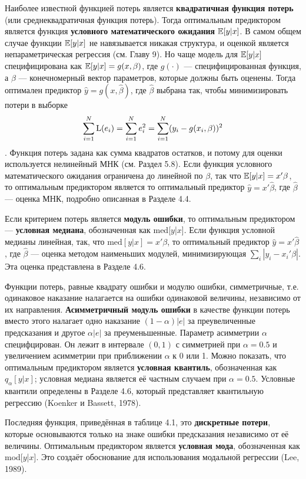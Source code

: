 Наиболее известной функцией потерь является \textbf{квадратичная функция потерь}  (или среднеквадратичная функция потерь). Тогда оптимальным предиктором является функция \textbf{условного математического ожидания} $\mathbb{E}{[y|x]}$. В самом общем случае функции $\mathbb{E}{[y|x]}$ не навязывается никакая структура, и оценкой является непараметрическая регрессия (см. Главу 9). Но чаще модель для $\mathbb{E}{[y|x]}$ специфицирована как $\mathbb{E}{[y|x]} = g(x, \beta)$, где $g(\cdot)$ --- специфицированная функция, а $\beta$ --- конечномерный вектор параметров, которые должны быть оценены. Тогда оптимален предиктор $\hat{y} = g(x, \hat{\beta})$, где $\hat{\beta}$ выбрана так, чтобы минимизировать потери в выборке 
\[
\sum_{i=1}^{N}\mathrm{L}(e_i) = \sum_{i=1}^{N}e_i^2 = \sum_{i=1}^{N}(y_i - g(x_i, \beta))^2
\].
Функция потерь задана как сумма квадратов остатков, и потому для оценки используется нелинейный МНК (см. Раздел 5.8). Если функция условного математического ожидания ограничена до линейной по $\beta$, так что $\mathbb{E}{[y|x]} = x' \beta $, то оптимальным предиктором является то оптимальный предиктор $\hat{y}=x'\hat{\beta}$, где $\hat{\beta}$ --- оценка МНК, подробно описанная в Разделе 4.4. 

Если критерием потерь является \textbf{модуль ошибки}, то оптимальным предиктором --- \textbf{условная медиана}, обозначенная как med[$y$|$x$]. Если функция условной медианы линейная, так, что $\mathrm{med}[y|x] = x'\beta$, то оптимальный предиктор $\hat{y}=x'\hat{\beta}$, где  $\hat{\beta}$ --- оценка методом наименьших модулей, минимизирующая $\sum_i |y_i - x_i ' \beta|$. Эта оценка представлена в Разделе 4.6.

Функции потерь, равные квадрату ошибки и модулю ошибки, симметричные, т.е. одинаковое наказание налагается на ошибки одинаковой величины, независимо от их направления.  \textbf{Асимметричный модуль ошибки} в качестве функции потерь вместо этого налагает одно наказание  $(1-\alpha) |e|$ за преувеличенные предсказания и другое $\alpha |e|$ за преуменьшенные. Параметр асимметрии $\alpha$ специфцирован. Он лежит в интервале $(0, 1)$ с симметрией при $\alpha = 0.5$ и увеличением асимметрии при приближении $\alpha$ к 0 или 1. Можно показать, что оптимальным предиктором является \textbf{условная квантиль}, обозначенная как $q_{\alpha}[y|x]$; условная медиана является её частным случаем при $\alpha = 0.5$. Условные квантили определены в Разделе 4.6, который представляет квантильную регрессию (Koenker и Bassett, 1978).

Последняя функция, приведённая в таблице 4.1, это \textbf{дискретные потери}, которые основываются только на знаке ошибки предсказания независимо от её величины. Оптимальным предиктором является \textbf{условная мода}, обозначенная как mod[$y$|$x$]. Это создаёт обоснование для использования модальной регрессии (Lee, 1989).

